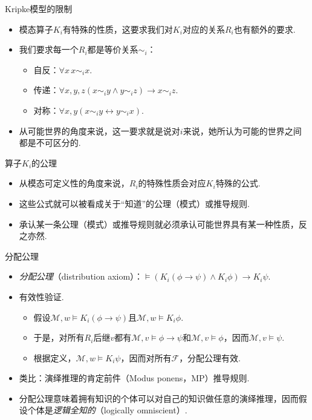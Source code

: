 {Kripke模型的限制}
\begin{itemize}
    \item 模态算子$K_i$有特殊的性质，这要求我们对$K_i$对应的关系$R_i$也有额外的要求.
    \item 我们要求每一个$R_i$都是等价关系$\sim_i$：
    \begin{itemize}
        \item 自反：$\forall x\, x\sim_ix$.
        \item 传递：$\forall x,y,z(x\sim_iy\wedge y\sim_iz)\to x\sim_iz$.
        \item 对称：$\forall x,y(x \sim_i y\leftrightarrow y\sim_ix)$.
    \end{itemize}
    \item 从可能世界的角度来说，这一要求就是说对$i$来说，她所认为可能的世界之间都是不可区分的.
\end{itemize}

{算子$K_i$的公理}
\begin{itemize}
    \item 从模态可定义性的角度来说，$R_i$的特殊性质会对应$K_i$特殊的公式.
    \item 这些公式就可以被看成关于“知道”的公理（模式）或推导规则.
    \item 承认某一条公理（模式）或推导规则就必须承认可能世界具有某一种性质，反之亦然.
\end{itemize}

{分配公理}
\begin{itemize}
    \item \emph{分配公理}（distribution axiom）：$\vDash (K_i(\phi\to\psi)\wedge K_i\phi)\to K_i\psi$.
    \item 有效性验证.
    \begin{itemize}
        \item 假设$\mathcal M,w\vDash K_i(\phi\to\psi)$且$\mathcal M,w\vDash K_i \phi$.
        \item 于是，对所有$R_i$后继$v$都有$\mathcal M,v\vDash\phi\to\psi$和$\mathcal M,v\vDash\phi$，因而$\mathcal M,v\vDash\psi$.
        \item 根据定义，$\mathcal M,w\vDash K_i\psi$，因而对所有$\mathcal F$，分配公理有效.
    \end{itemize}
    \item 类比：演绎推理的肯定前件（Modus ponens，MP）推导规则.
    \item 分配公理意味着拥有知识的个体可以对自己的知识做任意的演绎推理，因而假设个体是\emph{逻辑全知的}（logically omniscient）.
\end{itemize}

